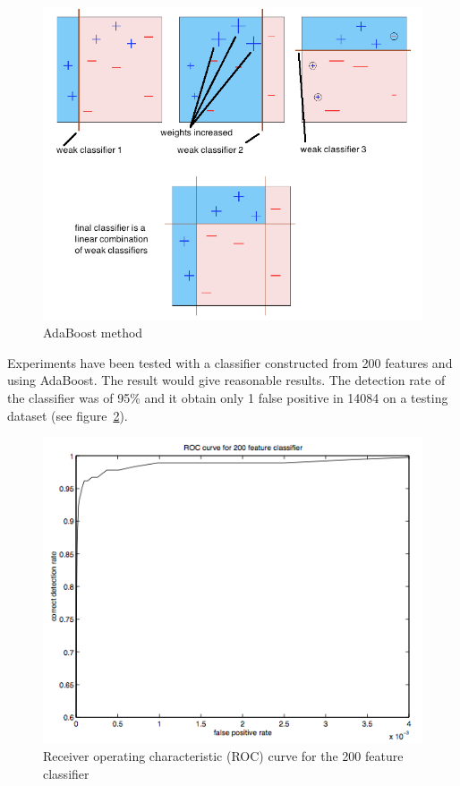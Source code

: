 \begin{figure}[!h]
\begin{center}
\noindent \includegraphics[scale=0.6]{figures/haar_feature_adaboost} 
\newline
\caption{AdaBoost method}
\label{haar_feature_adaboost}
\end{center} 
\end{figure}

\noindent Experiments have been tested with a classifier constructed from 200 features and using AdaBoost. The result would give reasonable results. The detection rate of the classifier was of 95\% and it obtain only 1 false positive in 14084 on a testing dataset (see figure~\ref{haar_feature_example_result})\cite{VIO01}.
\newline

\begin{figure}[!h]
\begin{center}
\noindent \includegraphics[scale=0.8]{figures/haar_feature_example_result} 
\newline
\caption{Receiver operating characteristic (ROC) curve for the 200 feature classifier}
\label{haar_feature_example_result}
\end{center} 
\end{figure}

